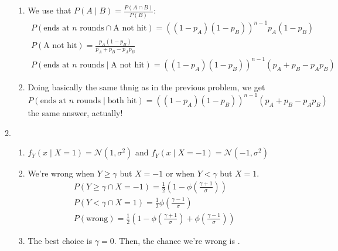 \documentclass[12pt]{article}
\begin{document}
\begin{enumerate}
\begin{enumerate}
\begin{enumerate}
                              \item We use that $P(A \mid B)=\frac{P(A \cap B)}{P(B)}$:
                                    \begin{gather*}
                                          P(\text{ends at $n$ rounds} \cap \text{A not hit})=\left(\left(1-p_A\right)\left(1-p_B\right)\right)^{n-1} p_A \left(1-p_B\right) \\
                                          P(\text{A not hit})=\frac{p_A(1-p_B)}{p_A+p_B-p_Ap_B} \\
                                          P(\text{ends at $n$ rounds} \mid \text{A not hit})=\boxed{\left(\left(1-p_A\right)\left(1-p_B\right)\right)^{n-1}(p_A+p_B-p_Ap_B)}
                                    \end{gather*}
                              \item Doing basically the same thnig as in the previous problem, we get
                                    \[P(\text{ends at $n$ rounds} \mid \text{both hit})=\boxed{\left(\left(1-p_A\right)\left(1-p_B\right)\right)^{n-1}(p_A+p_B-p_Ap_B)}\]
                                    the same answer, actually!
                        \end{enumerate}
                  \item \begin{enumerate}
                              \item $f_Y(x \mid X=1)=\mathcal{N}\left(1, \sigma^2\right)$ and $f_Y(x \mid X=-1)=\mathcal{N}\left(-1, \sigma^2\right)$
                              \item We're wrong when $Y \ge \gamma$ but $X=-1$ or when $Y < \gamma$ but $X=1$.
                                    \begin{gather*}
                                          P(Y \ge \gamma \cap X=-1) = \frac{1}{2}\left(1-\phi\left(\frac{\gamma+1}{\sigma}\right)\right) \\
                                          P(Y < \gamma \cap X=1) = \frac{1}{2}\phi\left(\frac{\gamma-1}{\sigma}\right) \\
                                          P(\text{wrong}) = \frac{1}{2}\left(1-\phi\left(\frac{\gamma+1     }{\sigma}\right)+\phi\left(\frac{\gamma-1}{\sigma}\right)\right)
                                    \end{gather*}
                              \item The best choice is $\gamma=0$.
                                    Then, the chance we're wrong is .

\end{enumerate}
\end{enumerate}
\end{enumerate}
\end{document}
